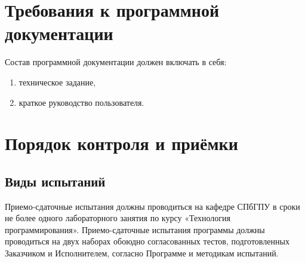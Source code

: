\documentclass[a4paper,10pt]{article}
\begin{document}
\section{Требования к программной документации}
Состав программной документации должен включать в себя:
\begin{enumerate}
  \item техническое задание,
  \item краткое руководство пользователя.
\end{enumerate}



\section{Порядок контроля и приёмки}
\subsection{Виды испытаний}
Приемо-сдаточные испытания должны проводиться на кафедре СПбГПУ в сроки не более одного лабораторного занятия по курсу «Технология программирования».
Приемо-сдаточные испытания программы должны проводиться на двух наборах обоюдно согласованных тестов, 
подготовленных Заказчиком и Исполнителем, согласно Программе и методикам испытаний.
\end{document}
